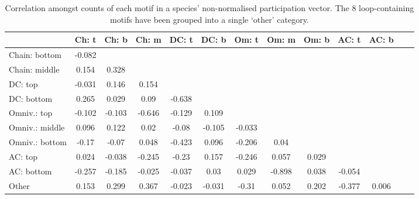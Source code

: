\documentclass[12pt]{article}
\begin{document}
\begin{spacing}{2.0}
		\begin{table}[hb!]
    		\caption{Correlation amongst counts of each motif in a species' non-normalised participation vector. The 8 loop-containing motifs have been grouped into a single `other' category.}
    		\label{tab:position_Z_correlations}
    		\footnotesize
    		\begin{tabular}{l | c c c c c c c c c c c c}    
        		&	Ch: t	&	Ch: b	&	Ch: m	&	DC: t	&	DC: b	&	Om: t	&	Om: m	&	Om: b	&	AC: t	& AC: b\\
        		\hline
                Chain: bottom	&	-0.082	&		&		&		&		&		&		&		&		&		\\
                Chain: middle	&	0.154	&	0.328	&		&		&		&		&		&		&		&		\\
                DC: top	&	-0.031	&	0.146	&	0.154	&		&		&		&		&		&		&		\\
                DC: bottom	&	0.265	&	0.029	&	0.09	&	-0.638	&		&		&		&		&		&		\\
                Omniv.: top	&	-0.102	&	-0.103	&	-0.646	&	-0.129	&	0.109	&		&		&		&		&		\\
                Omniv.: middle	&	0.096	&	0.122	&	0.02	&	-0.08	&	-0.105	&	-0.033	&		&		&		&		\\
                Omniv.: bottom	&	-0.17	&	-0.07	&	0.048	&	-0.423	&	0.096	&	-0.206	&	0.04	&		&		&		\\
                AC: top	&	0.024	&	-0.038	&	-0.245	&	-0.23	&	0.157	&	-0.246	&	0.057	&	0.029	&		&		\\
                AC: bottom	&	-0.257	&	-0.185	&	-0.025	&	-0.037	&	0.03	&	0.029	&	-0.898	&	0.038	&	-0.054	&		\\
                Other	&	0.153	&	0.299	&	0.367	&	-0.023	&	-0.031	&	-0.31	&	0.052	&	0.202	&	-0.377	&	0.006	\\
            \hline
            \end{tabular}
            \end{table}




\clearpage















\end{spacing}
\end{document}
